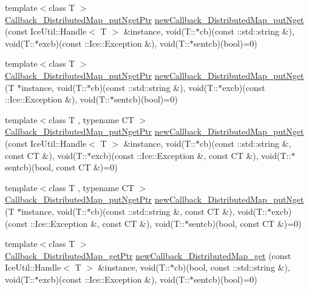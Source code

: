 \begin{DoxyCompactItemize}
\item 
{\footnotesize template$<$class T $>$ }\\\hyperlink{namespace_global_table_afeefcdd5dfb862806549e834b8727011}{Callback\_\-DistributedMap\_\-putNgetPtr} \hyperlink{namespace_global_table_a22b3fb5dbf946b04af1956dd48b1cb4c}{newCallback\_\-DistributedMap\_\-putNget} (const IceUtil::Handle$<$ T $>$ \&instance, void(T::$\ast$cb)(const ::std::string \&), void(T::$\ast$excb)(const ::Ice::Exception \&), void(T::$\ast$sentcb)(bool)=0)
\item 
{\footnotesize template$<$class T $>$ }\\\hyperlink{namespace_global_table_afeefcdd5dfb862806549e834b8727011}{Callback\_\-DistributedMap\_\-putNgetPtr} \hyperlink{namespace_global_table_a5a05f2b3952e9e01b2eb083ed91c2426}{newCallback\_\-DistributedMap\_\-putNget} (T $\ast$instance, void(T::$\ast$cb)(const ::std::string \&), void(T::$\ast$excb)(const ::Ice::Exception \&), void(T::$\ast$sentcb)(bool)=0)
\item 
{\footnotesize template$<$class T , typename CT $>$ }\\\hyperlink{namespace_global_table_afeefcdd5dfb862806549e834b8727011}{Callback\_\-DistributedMap\_\-putNgetPtr} \hyperlink{namespace_global_table_ad2b40e0d4f3150e5ed3477e24b5366a7}{newCallback\_\-DistributedMap\_\-putNget} (const IceUtil::Handle$<$ T $>$ \&instance, void(T::$\ast$cb)(const ::std::string \&, const CT \&), void(T::$\ast$excb)(const ::Ice::Exception \&, const CT \&), void(T::$\ast$sentcb)(bool, const CT \&)=0)
\item 
{\footnotesize template$<$class T , typename CT $>$ }\\\hyperlink{namespace_global_table_afeefcdd5dfb862806549e834b8727011}{Callback\_\-DistributedMap\_\-putNgetPtr} \hyperlink{namespace_global_table_a9ee2209df3a2184964034042fd6f1ecb}{newCallback\_\-DistributedMap\_\-putNget} (T $\ast$instance, void(T::$\ast$cb)(const ::std::string \&, const CT \&), void(T::$\ast$excb)(const ::Ice::Exception \&, const CT \&), void(T::$\ast$sentcb)(bool, const CT \&)=0)
\item 
{\footnotesize template$<$class T $>$ }\\\hyperlink{namespace_global_table_a9ad421b8bc43ec4b2173407f2bed7ecc}{Callback\_\-DistributedMap\_\-getPtr} \hyperlink{namespace_global_table_a315f9a738ac5bb0e7e62e036d6982743}{newCallback\_\-DistributedMap\_\-get} (const IceUtil::Handle$<$ T $>$ \&instance, void(T::$\ast$cb)(bool, const ::std::string \&), void(T::$\ast$excb)(const ::Ice::Exception \&), void(T::$\ast$sentcb)(bool)=0)

\end{DoxyCompactItemize}
